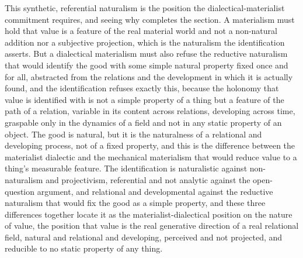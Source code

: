 This synthetic, referential naturalism is the position the dialectical-materialist commitment requires, and seeing why completes the section. A materialism must hold that value is a feature of the real material world and not a non-natural addition nor a subjective projection, which is the naturalism the identification asserts. But a dialectical materialism must also refuse the reductive naturalism that would identify the good with some simple natural property fixed once and for all, abstracted from the relations and the development in which it is actually found, and the identification refuses exactly this, because the holonomy that value is identified with is not a simple property of a thing but a feature of the path of a relation, variable in its content across relations, developing across time, graspable only in the dynamics of a field and not in any static property of an object. The good is natural, but it is the naturalness of a relational and developing process, not of a fixed property, and this is the difference between the materialist dialectic and the mechanical materialism that would reduce value to a thing's measurable feature. The identification is naturalistic against non-naturalism and projectivism, referential and not analytic against the open-question argument, and relational and developmental against the reductive naturalism that would fix the good as a simple property, and these three differences together locate it as the materialist-dialectical position on the nature of value, the position that value is the real generative direction of a real relational field, natural and relational and developing, perceived and not projected, and reducible to no static property of any thing.
